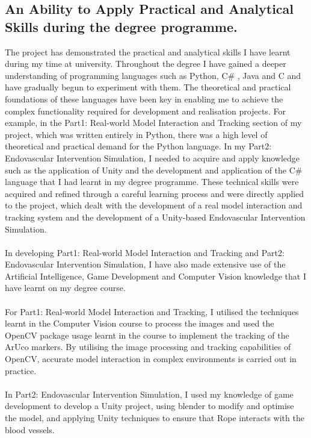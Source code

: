 \documentclass[12pt]{article}
\begin{document}
\subsection{An Ability to Apply Practical and Analytical Skills during the degree programme.}
The project has demonstrated the practical and analytical skills I have learnt during my time at university. Throughout the degree I have gained a deeper understanding of programming languages such as Python, C\# , Java and C\+\+ and have gradually begun to experiment with them. The theoretical and practical foundations of these languages have been key in enabling me to achieve the complex functionality required for development and realisation projects. For example, in the Part1: Real-world Model Interaction and Tracking section of my project, which was written entirely in Python, there was a high level of theoretical and practical demand for the Python language. In my Part2: Endovascular Intervention Simulation, I needed to acquire and apply knowledge such as the application of Unity and the development and application of the C\# language that I had learnt in my degree programme. These technical skills were acquired and refined through a careful learning process and were directly applied to the project, which dealt with the development of a real model interaction and tracking system and the development of a Unity-based Endovascular Intervention Simulation.
\\\\
In developing Part1: Real-world Model Interaction and Tracking and Part2: Endovascular Intervention Simulation, I have also made extensive use of the Artificial Intelligence, Game Development and Computer Vision knowledge that I have learnt on my degree course.
\\\\
For Part1: Real-world Model Interaction and Tracking, I utilised the techniques learnt in the Computer Vision course to process the images and used the OpenCV package usage learnt in the course to implement the tracking of the ArUco markers. By utilising the image processing and tracking capabilities of OpenCV, accurate model interaction in complex environments is carried out in practice.
\\\\
In Part2: Endovascular Intervention Simulation, I used my knowledge of game development to develop a Unity project, using \gls{blender} to modify and optimise the model, and applying Unity techniques to ensure that Rope interacts with the blood vessels.
\\\\
\end{document}
